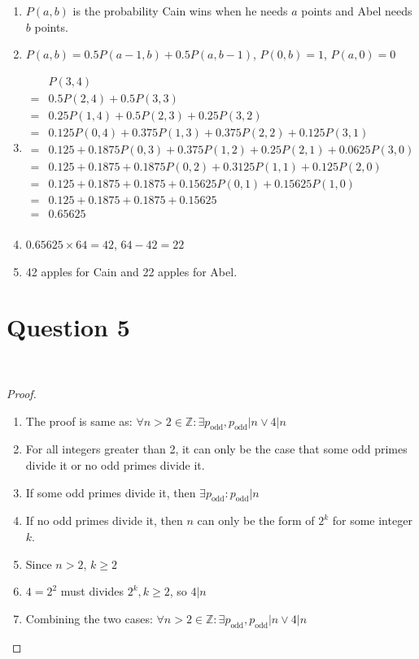 \documentclass{article}
\begin{document}
\begin{enumerate}
    \item $P(a,b)$ is the probability Cain wins when he needs $a$ points and Abel needs $b$ points.
    \item $P(a,b)= 0.5P(a-1,b)+0.5P(a,b-1)$, $P(0,b)=1$, $P(a,0)=0$
    \item \begin{align*}
        &P(3,4)\\
        =&0.5P(2,4)+0.5P(3,3)\\
        =&0.25P(1,4)+0.5P(2,3)+0.25P(3,2)\\
        =&0.125P(0,4)+0.375P(1,3)+0.375P(2,2)+0.125P(3,1)\\
        =&0.125+0.1875P(0,3)+0.375P(1,2)+0.25P(2,1)+0.0625P(3,0)\\
        =&0.125+0.1875+0.1875P(0,2)+0.3125P(1,1)+0.125P(2,0)\\
        =&0.125+0.1875+0.1875+0.15625P(0,1)+0.15625P(1,0)\\
        =&0.125+0.1875+0.1875+0.15625\\
        =&0.65625\\
    \end{align*}
    \item $0.65625\times 64=42$, $64-42=22$
    \item 42 apples for Cain and 22 apples for Abel.
\end{enumerate}

\newpage

\section*{Question 5}

~

\begin{proof}
    ~
    \begin{enumerate}
        \item The proof is same as: $\forall n>2\in\mathbb{Z}: \exists p_\text{odd}, p_\text{odd}|n\lor 4|n$
        \item For all integers greater than 2, it can only be the case that some odd primes divide it or no odd primes divide it.
        \item If some odd primes divide it, then $\exists p_\text{odd}:p_\text{odd}|n$
        \item If no odd primes divide it, then $n$ can only be the form of $2^k$ for some integer $k$.
        \item Since $n>2$, $k\geq2$
        \item $4=2^2$ must divides $2^k,k\geq 2$, so $4|n$
        \item Combining the two cases: $\forall n>2\in\mathbb{Z}: \exists p_\text{odd}, p_\text{odd}|n\lor 4|n$
    \end{enumerate}
\end{proof}
\end{document}

